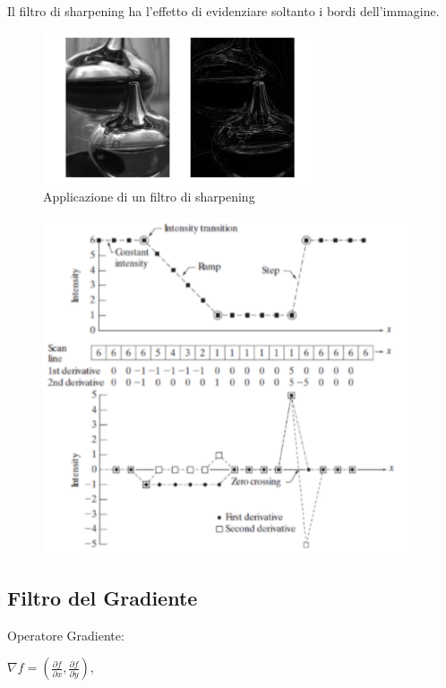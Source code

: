 Il filtro di sharpening ha l'effetto di evidenziare soltanto i bordi dell'immagine.
\begin{figure}[H]
    \centering
    \includegraphics[width=8cm, keepaspectratio]{capitoli/immagini/imgs/sharpening.png}
    \caption{Applicazione di un filtro di sharpening}
\end{figure}

\begin{figure}[H]
    \centering
    \includegraphics[width=11cm, keepaspectratio]{capitoli/immagini/imgs/sharpering2.png}
\end{figure}

\subsection{Filtro del Gradiente}

Operatore Gradiente:

\begin{center}
    $\nabla f=(\frac{\partial{f}}{\partial{x}}, \frac{\partial{f}}{\partial{y}})$,
\end{center}

